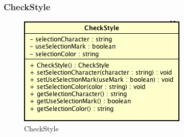 \subsubsection{CheckStyle}

\label{CheckStyle}
\begin{figure}[ht]
	\centering
	\includegraphics[scale=0.5]{Sezioni/SottosezioniST/img/CheckStyle.png}
	\caption{CheckStyle}
\end{figure}

